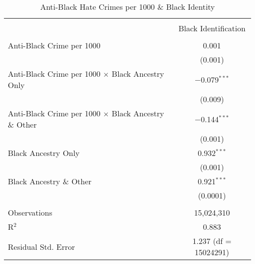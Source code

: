 \documentclass{article}
\begin{document}
        \begin{table}[!htbp] \centering
          \caption{Anti-Black Hate Crimes per 1000 \& Black Identity}
          \begin{tabular}{@{\extracolsep{5pt}}lc} 
            \\[-1.8ex]\hline 
            \hline \\[-1.8ex] 
             & \multicolumn{1}{c}{\small{Black Identification}} \\ 
            \hline \\[-1.8ex] 
             Anti-Black Crime per 1000 & 0.001 \\
              & \small{(0.001)} \\     
             Anti-Black Crime per 1000 $\times$ Black Ancestry Only & $-$0.079$^{***}$ \\ 
              & \small{(0.009)} \\ 
             Anti-Black Crime per 1000 $\times$ Black Ancestry \& Other & $-$0.144$^{***}$ \\ 
              & \small{(0.001)} \\           
             Black Ancestry Only & 0.932$^{***}$ \\ 
              & \small{(0.001)} \\ 
             Black Ancestry \& Other & 0.921$^{***}$ \\ 
              & \small{(0.0001)} \\ 
            \hline \\[-1.8ex] 
            Observations & 15,024,310 \\ 
            R$^{2}$ & 0.883 \\ 
            Residual Std. Error & 1.237 (df = 15024291) \\ 
        \end{tabular} 
        \label{tab:anti_blk1000_yr}
        \end{table} 
        
\end{document}
